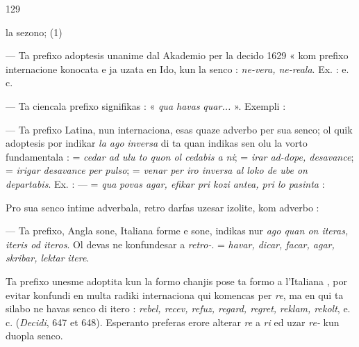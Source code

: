 \begin{VUpage}[133]{129}

\VUcontinue
la sezono; \cc
{} (1)

 --- Ta prefixo adoptesis unanime dal Akademio\nl
per la decido 1629 « kom prefixo internacione konocata\nl
e ja uzata en Ido, kun la senco : \textit{ne-vera, ne-reala}. Ex. :\nl
{}\cc
{}\cc
{} e. c.

 --- Ta ciencala prefixo signifikas : « \textit{qua havas}\nl
\textit{quar...} ». Exempli : \nl
{}

 --- Ta prefixo Latina, nun internaciona, esas quaze\nl
adverbo per sua senco; ol quik adoptesis por indikar \textit{la ago}\nl
\textit{inversa} di ta quan indikas sen olu la vorto fundamentala :\nl
{} = \textit{cedar ad ulu to quon ol cedabis a ni}; \nl
= \textit{irar ad-dope, desavance};  = \textit{irigar desavance per}\nl
\textit{pulso};  = \textit{venar per iro inversa al loko de ube on}\nl
\textit{departabis}. Ex. : \cc
{} ---  = \textit{qua}\nl
\textit{povas agar, efikar pri kozi antea, pri lo pasinta} : \nl
{}

Pro sua senco intime adverbala, retro darfas uzesar izolite,\nl
kom adverbo : 

 --- Ta prefixo, Angla sone, Italiana forme e sone,\nl
indikas nur \textit{ago quan on iteras, iteris od iteros}. Ol devas\nl
ne konfundesar a \textit{retro-}. \nl
{} = \textit{havar, dicar, facar, agar, skribar, lektar}\nl
\textit{itere}. \cc
{}

Ta prefixo unesme adoptita kun la formo  chanjis pose\nl
ta formo a l'Italiana , por evitar konfundi en multa radiki\nl
internaciona qui komencas per \textit{re}, ma en qui ta silabo ne\nl
havas senco di itero : \textit{rebel, recev, refuz, regard, regret,}\nl
\textit{reklam, rekolt}, e. c. (\textit{Decidi}, 647 et 648). Esperanto preferas\nl
erore alterar \textit{re} a \textit{ri} ed uzar \textit{re-} kun duopla senco.
\end{VUpage}

